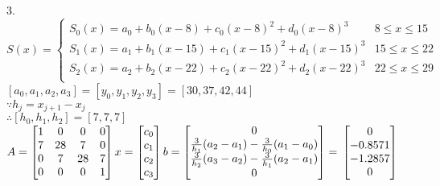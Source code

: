 \documentclass[a4paper]{article}
\begin{document}
3.\\
$$S(x)=
\begin{cases}
S_0(x)=a_0 + b_0(x-8) + c_0(x-8)^2 + d_0(x-8)^3& 8 \leqslant x \leqslant 15\\
S_1(x)=a_1 + b_1(x-15) + c_1(x-15)^2 + d_1(x-15)^3& 15 \leqslant x \leqslant 22\\
S_2(x)=a_2 + b_2(x-22) + c_2(x-22)^2 + d_2(x-22)^3& 22 \leqslant x \leqslant 29\\
\end{cases}$$
$[a_0, a_1, a_2, a_3] = [y_0, y_1, y_2, y_3] = [30, 37, 42, 44]$\\
$\because h_j = x_{j+1} - x_j$\\
$\therefore [h_0, h_1, h_2] = [7, 7, 7]$\\
$A =
\begin{bmatrix}
    1                       & 0                      & 0  & 0 \\
    7                       & 28                     & 7  & 0 \\
    0                       & 7                      & 28 & 7 \\
    0 & 0& 0  & 1 \\
\end{bmatrix}
x =
\begin{bmatrix}
    c_0                     \\
    c_1                     \\
    c_2                     \\
    c_3                     \\
\end{bmatrix}
b =
\begin{bmatrix}
    0                     \\
    \frac{3}{h_1}(a_2-a_1) - \frac{3}{h_0}(a_1-a_0)                     \\
    \frac{3}{h_2}(a_3-a_2) - \frac{3}{h_1}(a_2-a_1)                     \\
    0                     \\
\end{bmatrix}=\\
\begin{bmatrix}
    0                     \\
    -0.8571                     \\
    -1.2857                     \\
    0                     \\
\end{bmatrix}$\\
\end{document}
